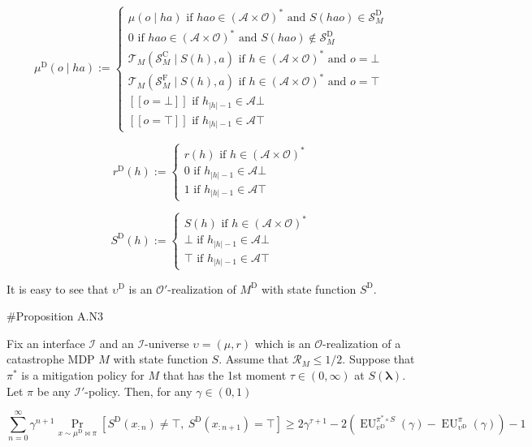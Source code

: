 \documentclass[a4paper]{article}
\newcommand{\Comment}[1]{}
\newcommand{\AP}[1]{\left(#1\right)}
\newcommand{\AB}[1]{\left[#1\right]}
\newcommand{\Pa}[2]{\underset{#1}{\operatorname{Pr}}\AB{#2}}
\newcommand{\Estr}{\boldsymbol{\lambda}}
\newcommand{\Abs}[1]{\lvert #1 \rvert}
\newcommand{\M}{\xrightarrow{\textnormal{k}}}
\newcommand{\Ob}{\mathcal{O}}
\newcommand{\A}{\mathcal{A}}
\newcommand{\St}{\mathcal{S}}
\newcommand{\T}{\mathcal{T}}
\newcommand{\R}{\mathcal{R}}
\newcommand{\In}{\mathcal{I}}
\newcommand{\FH}{(\A \times \Ob)^*}
\newcommand{\RMC}{\mathrm{C}}
\newcommand{\RMD}{\mathrm{D}}
\newcommand{\RMF}{\mathrm{F}}
\newcommand{\SF}{\St^{\RMF}}
\newcommand{\SD}{\St^{\RMD}}
\newcommand{\SC}{\St^{\RMC}}
\newcommand{\MD}{M^{\RMD}}
\newcommand{\PD}{\pi^{\RMD}}
\newcommand{\UD}{\upsilon^{\RMD}}
\newcommand{\EU}{\operatorname{EU}}
\begin{document}
$$\mu^\RMD(o \mid ha) := \begin{cases} \mu(o \mid ha) \text{ if } hao\in\FH \text{ and } S(hao)\in\SD_M \\ 0 \text{ if } hao\in\FH \text{ and } S(hao)\not\in\SD_M \\ \T_M\AP{\SC_M \mid S(h),a} \text{ if } h\in\FH \text{ and } o=\bot \\ \T_M\AP{\SF_M \mid S(h),a} \text{ if } h\in\FH \text{ and } o=\top \\ [[o=\bot]] \text{ if } h_{\Abs{h}-1} \in \A  \bot \\ [[o=\top]] \text{ if } h_{\Abs{h}-1} \in \A  \top \end{cases}$$

$$r^\RMD(h):=\begin{cases} r(h) \text{ if } h\in\FH \\ 0 \text{ if } h_{\Abs{h}-1} \in \A \bot \\ 1 \text{ if } h_{\Abs{h}-1} \in \A \top \end{cases}$$

$$S^\RMD(h):=\begin{cases} S(h) \text{ if } h\in\FH \\ \bot \text{ if } h_{\Abs{h}-1} \in \A\bot \\ \top \text{ if } h_{\Abs{h}-1} \in \A \top \end{cases}$$

It is easy to see that $\UD$ is an $\Ob'$-realization of $\MD$ with state function $S^\RMD$.

\Comment{Given $\pi: \St_M \M \A_M$, we define $\PD: \St_{\MD} \M \A_M$ by

* For any $s \in \SD_M$, $\PD(s) = \pi(s)$.

* For $s \in \{\bot,\top\}$, $\PD(s)$ is arbitrary (because of how $\T_{\MD}$ is defined, the choice affects nothing).}

\#Proposition A.N3

Fix an interface $\In$ and an $\In$-universe $\upsilon=(\mu,r)$ which is an $\Ob$-realization of a catastrophe MDP $M$ with state function $S$. Assume that $\R_M \leq 1/2$. Suppose that $\pi^*$ is a mitigation policy for $M$ that has the 1st moment $\tau\in(0,\infty)$ at $S(\Estr)$. Let $\pi$ be any $\In'$-policy. Then, for any $\gamma\in(0,1)$

$$\sum_{n=0}^\infty \gamma^{n+1} \Pa{x \sim \mu^\RMD \bowtie \pi}{S^\RMD\AP{x_{:n}}\ne\top,\ S^\RMD\AP{x_{:n+1}}=\top} \geq 2{\gamma^{\tau+1}}-2\AP{\EU_{\UD}^{\pi^* \circ S}(\gamma)-\EU_{\UD}^{\pi}(\gamma)}-1$$
\end{document}
